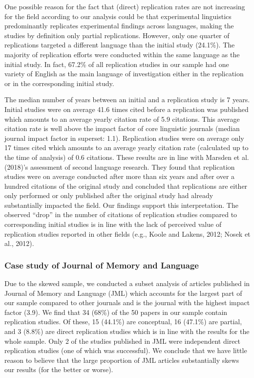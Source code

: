 \documentclass[]{elsarticle} %
\begin{document}
One possible reason for the fact that (direct) replication rates are not increasing for the field according to our analysis could be that experimental linguistics predominantly replicates experimental findings across languages, making the studies by definition only partial replications.
However, only one quarter of replications targeted a different language than the initial study (24.1\%).
The majority of replication efforts were conducted within the same language as the initial study.
In fact, 67.2\% of all replication studies in our sample had one variety of English as the main language of investigation either in the replication or in the corresponding initial study.

The median number of years between an initial and a replication study is 7 years.
Initial studies were on average 41.6 times cited before a replication was published which amounts to an average yearly citation rate of 5.9 citations.
This average citation rate is well above the impact factor of core linguistic journals (median journal impact factor in superset: 1.1).
Replication studies were on average only 17 times cited which amounts to an average yearly citation rate (calculated up to the time of analysis) of 0.6 citations. These results are in line with Marsden et al. (2018)'s assessment of second language research. They found that replication studies were on average conducted after more than six years and after over a hundred citations of the original study and concluded that replications are either only performed or only published after the original study had already substantially impacted the field. Our findings support this interpretation.
The observed ``drop'' in the number of citations of replication studies compared to corresponding initial studies is in line with the lack of perceived value of replication studies reported in other fields (e.g., Koole and Lakens, 2012; Nosek et al., 2012).

\hypertarget{case-study-of-journal-of-memory-and-language}{%
\subsubsection{Case study of Journal of Memory and Language}\label{case-study-of-journal-of-memory-and-language}}

Due to the skewed sample, we conducted a subset analysis of articles published in Journal of Memory and Language (JML) which accounts for the largest part of our sample compared to other journals and is the journal with the highest impact factor (3.9). We find that 34 (68\%) of the 50 papers in our sample contain replication studies. Of these, 15 (44.1\%) are conceptual, 16 (47.1\%) are partial, and 3 (8.8\%) are direct replication studies which is in line with the results for the whole sample. Only 2 of the studies published in JML were independent direct replication studies (one of which was successful). We conclude that we have little reason to believe that the large proportion of JML articles substantially skews our results (for the better or worse).
\end{document}
